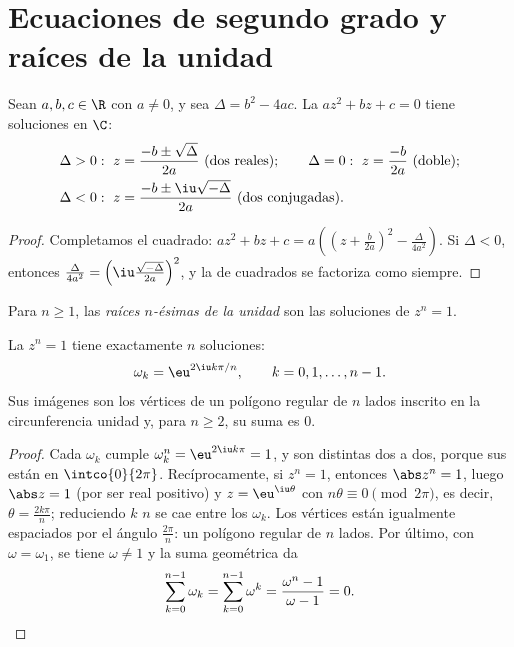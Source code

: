 \section{Ecuaciones de segundo grado y raíces de la unidad}

\begin{theorem}\label{thm:g12:complex:quadratic}
Sean $a, b, c \in \R$ con $a \neq 0$, y sea $\Delta = b^2 - 4ac$. La
 $az^2 + bz + c = 0$ tiene soluciones en $\C$:
\[
\begin{aligned}
&\Delta > 0:\ z = \frac{-b \pm \sqrt{\Delta}}{2a} \ (\text{dos reales}); \qquad
\Delta = 0:\ z = \frac{-b}{2a} \ (\text{doble}); \\
&\Delta < 0:\ z = \frac{-b \pm \iu\sqrt{-\Delta}}{2a} \ (\text{dos conjugadas}).
\end{aligned}
\]
\end{theorem}

\begin{proof}
Completamos el cuadrado:
$az^2 + bz + c = a\left(\left(z + \frac{b}{2a}\right)^2 -
\frac{\Delta}{4a^2}\right)$. Si $\Delta < 0$, entonces
$\frac{\Delta}{4a^2} = \left(\iu\frac{\sqrt{-\Delta}}{2a}\right)^2$, y la
 de cuadrados se factoriza como siempre.
\end{proof}

\begin{definition}\label{def:g12:complex:rootsofunity}
Para $n \geq 1$, las \emph{raíces $n$-ésimas de la unidad} son las soluciones de $z^n = 1$.
\end{definition}

\begin{theorem}\label{thm:g12:complex:rootsofunity}
La  $z^n = 1$ tiene exactamente $n$ soluciones:
\[
\omega_k = \eu^{2\iu k\pi/n}, \qquad k = 0, 1, \dots, n-1 .
\]
Sus imágenes son los vértices de un polígono regular de $n$ lados inscrito
en la circunferencia unidad y, para $n \geq 2$, su suma es $0$.
\end{theorem}

\begin{proof}
Cada $\omega_k$ cumple $\omega_k^n = \eu^{2\iu k\pi} = 1$, y son distintas
dos a dos, porque sus  están en $\intco{0}{2\pi}$.
Recíprocamente, si $z^n = 1$, entonces $\abs z^n = 1$, luego $\abs z = 1$
(por ser real positivo) y $z = \eu^{\iu\theta}$ con
$n\theta \equiv 0 \pmod{2\pi}$, es decir, $\theta = \frac{2k\pi}{n}$;
reduciendo $k$  $n$ se cae entre los $\omega_k$. Los vértices están
igualmente espaciados por el ángulo $\frac{2\pi}{n}$: un polígono regular de
$n$ lados. Por último, con $\omega = \omega_1$, se tiene $\omega \neq 1$ y
la suma geométrica da
\[
\sum_{k=0}^{n-1}\omega_k = \sum_{k=0}^{n-1}\omega^k
= \frac{\omega^n - 1}{\omega - 1} = 0 . \qedhere
\]
\end{proof}

